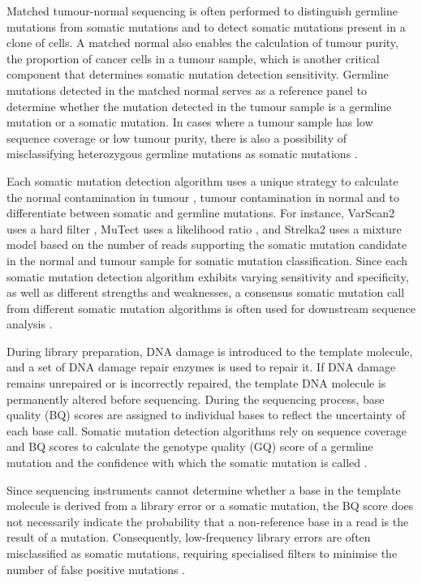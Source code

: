 Matched tumour-normal sequencing is often performed to distinguish germline mutations from somatic mutations and to detect somatic mutations present in a clone of cells. A matched normal also enables the calculation of tumour purity, the proportion of cancer cells in a tumour sample, which is another critical component that determines somatic mutation detection sensitivity. Germline mutations detected in the matched normal serves as a reference panel to determine whether the mutation detected in the tumour sample is a germline mutation or a somatic mutation. In cases where a tumour sample has low sequence coverage or low tumour purity, there is also a possibility of misclassifying heterozygous germline mutations as somatic mutations \cite{Cibulskis2013-gw}.

Each somatic mutation detection algorithm uses a unique strategy to calculate the normal contamination in tumour \cite{Cibulskis2011-tp}, tumour contamination in normal \cite{Taylor-Weiner2018-af} and to differentiate between somatic and germline mutations. For instance, VarScan2 uses a hard filter \cite{Koboldt2012-wd}, MuTect uses a likelihood ratio \cite{Cibulskis2013-gw}, and Strelka2 uses a mixture model \cite{Kim2018-qi} based on the number of reads supporting the somatic mutation candidate in the normal and tumour sample for somatic mutation classification. Since each somatic mutation detection algorithm exhibits varying sensitivity and specificity, as well as different strengths and weaknesses, a consensus somatic mutation call from different somatic mutation algorithms is often used for downstream sequence analysis \cite{Bailey2020-ou}.

During library preparation, DNA damage is introduced to the template molecule, and a set of DNA damage repair enzymes is used to repair it. If DNA damage remains unrepaired or is incorrectly repaired, the template DNA molecule is permanently altered before sequencing. During the sequencing process, base quality (BQ) scores are assigned to individual bases to reflect the uncertainty of each base call. Somatic mutation detection algorithms rely on sequence coverage and BQ scores to calculate the genotype quality (GQ) score of a germline mutation \cite{McKenna2010-br, Li2011-ag} and the confidence with which the somatic mutation is called \cite{Cibulskis2013-gw}. 

Since sequencing instruments cannot determine whether a base in the template molecule is derived from  a library error or a somatic mutation, the BQ score does not necessarily indicate the probability that a non-reference base in a read is the result of a mutation. Consequently, low-frequency library errors are often misclassified as somatic mutations, requiring specialised filters to minimise the number of false positive mutations \cite{Costello2013-cz, Chen2017-ba}.

